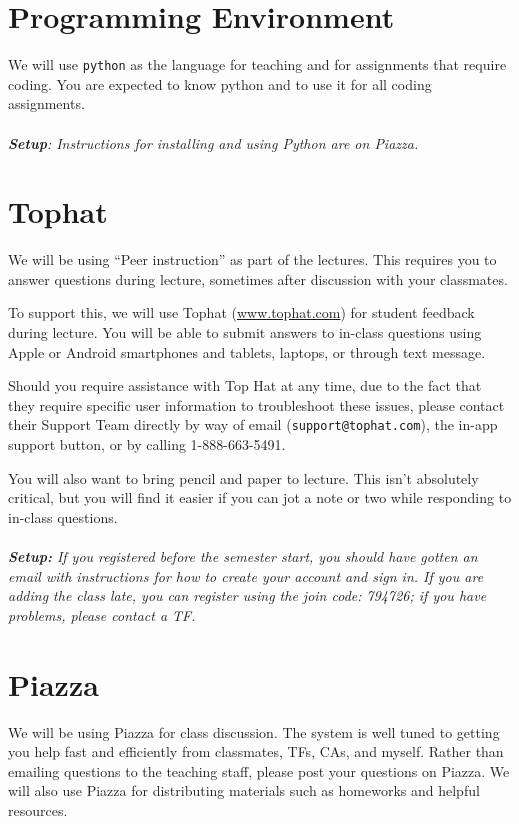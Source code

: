 \documentclass[11pt]{article}
\begin{document}
\section*{Programming Environment}

We will use \texttt{python} as the language for teaching and for
assignments that require coding.    You are expected to know python and
to use it for all coding assignments.
\\
~\\\noindent\emph{\textbf{Setup}: Instructions for installing and
using Python are on Piazza.}

\section*{Tophat}

We will be using ``Peer instruction'' as part of the lectures.  This
requires you to answer questions during lecture, sometimes
after discussion with your classmates.   

To support this, we will use Tophat (\url{www.tophat.com}) for student
feedback during lecture. You will be able to submit answers to in-class
questions using Apple or Android smartphones and tablets, laptops, or
through text message. 

Should you require assistance with Top Hat at any time, due to the fact
that they require specific user information to troubleshoot these
issues, please contact their Support Team directly by way of email
(\texttt{support@tophat.com}), the in-app support button, or by calling
1-888-663-5491. 

You will also want to bring pencil and paper to lecture.   This isn't
absolutely critical, but you will find it easier if you can jot a note
or two while responding to in-class questions.
\\
~\\\emph{\textbf{Setup:} If you registered before the semester start,
  you should have gotten an email with instructions for how to create
  your account and sign in.  If you are adding the
  class late, you can register using the join code: 794726; if you have
  problems, please contact a TF.} 

\section*{Piazza}

We will be using Piazza for class discussion. The system is well
tuned to getting you help fast and efficiently from classmates, TFs,
CAs,
and myself. Rather than emailing questions to the teaching staff,
please post your questions on Piazza.  
We will also use Piazza for distributing materials
such as homeworks and helpful resources.
\end{document}
